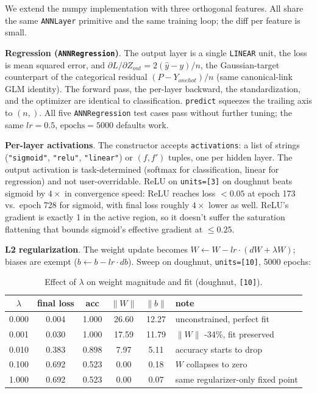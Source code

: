 \documentclass[10pt, a4paper]{article}
\begin{document}
We extend the numpy implementation with three orthogonal features. All share the same \texttt{ANNLayer} primitive and the same training loop; the diff per feature is small.

\textbf{Regression (\texttt{ANNRegression})}. The output layer is a single \texttt{LINEAR} unit, the loss is mean squared error, and \(\partial L / \partial Z_{out} = 2(\hat y - y)/n\), the Gaussian-target counterpart of the categorical residual \((P - Y_{onehot})/n\) (same canonical-link GLM identity). The forward pass, the per-layer backward, the standardization, and the optimizer are identical to classification. \texttt{predict} squeezes the trailing axis to \((n,)\). All five \texttt{ANNRegression} test cases pass without further tuning; the same \(lr=0.5\), \(\text{epochs}=5000\) defaults work.

\textbf{Per-layer activations}. The constructor accepts \texttt{activations}: a list of strings (\texttt{"sigmoid"}, \texttt{"relu"}, \texttt{"linear"}) or \((f, f')\) tuples, one per hidden layer. The output activation is task-determined (softmax for classification, linear for regression) and not user-overridable. ReLU on \texttt{units=[3]} on doughnut beats sigmoid by \(4\times\) in convergence speed: ReLU reaches loss \(<0.05\) at epoch 173 vs.\ epoch 728 for sigmoid, with final loss roughly \(4\times\) lower as well. ReLU's gradient is exactly 1 in the active region, so it doesn't suffer the saturation flattening that bounds sigmoid's effective gradient at \(\le 0.25\).

\textbf{L2 regularization}. The weight update becomes \(W \leftarrow W - lr \cdot (dW + \lambda W)\); biases are exempt (\(b \leftarrow b - lr \cdot db\)). Sweep on doughnut, \texttt{units=[10]}, 5000 epochs:

\begin{table}[h]
\centering
\caption{Effect of \(\lambda\) on weight magnitude and fit (doughnut, \texttt{[10]}).}
\label{tab:lambda}
\begin{tabular}{cccccl}
\toprule
\(\lambda\) & final loss & acc & \(\lVert W\rVert\) & \(\lVert b\rVert\) & note \\
\midrule
0.000  & 0.004 & 1.000 & 26.60 & 12.27 & unconstrained, perfect fit \\
0.001  & 0.030 & 1.000 & 17.59 & 11.79 & \(\lVert W\rVert\) -34\%, fit preserved \\
0.010  & 0.383 & 0.898 & \phantom{0}7.97 & \phantom{0}5.11 & accuracy starts to drop \\
0.100  & 0.692 & 0.523 & \phantom{0}0.00 & \phantom{0}0.18 & \(W\) collapses to zero \\
1.000  & 0.692 & 0.523 & \phantom{0}0.00 & \phantom{0}0.07 & same regularizer-only fixed point \\
\bottomrule
\end{tabular}
\end{table}
\end{document}
